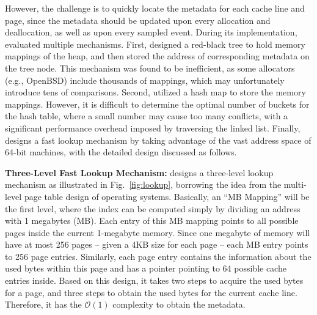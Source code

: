 However, the challenge is to quickly locate the metadata for each cache line and page, since the metadata should be updated upon every allocation and deallocation, as well as upon every sampled event. During its implementation, \MP{} evaluated multiple mechanisms. First, \MP{} designed a red-black tree to hold memory mappings of the heap, and then stored the address of corresponding metadata on the tree node. This mechanism was found to be inefficient, as some allocators (e.g., OpenBSD) include thousands of mappings, which may unfortunately introduce tens of comparisons. Second, \MP{} utilized a hash map to store the memory mappings. However, it is difficult to determine the optimal number of buckets for the hash table, where a small number may cause too many conflicts, with a significant performance overhead imposed by traversing the linked list. Finally, \MP{} designs a fast lookup mechanism by taking advantage of the vast address space of 64-bit machines, with the detailed design discussed as follows. 


\textbf{Three-Level Fast Lookup Mechanism:} \MP{} designs a three-level lookup mechanism as illustrated in Fig.~\ref{fig:lookup}, borrowing the idea from the multi-level page table design of operating systems. Basically, an ``MB Mapping'' will be the first level, where the index can be computed simply by dividing an address with 1 megabytes (MB). Each entry of this MB mapping points to all possible pages inside the current 1-megabyte memory. Since one megabyte of memory will have at most 256 pages -- given a 4KB size for each page -- each MB entry points to 256 page entries. Similarly, each page entry contains the information about the used bytes within this page and has a pointer pointing to 64 possible cache entries inside. Based on this design, it takes two steps to acquire the used bytes for a page, and three steps to obtain the used bytes for the current cache line. Therefore, it has the $\mathcal{O}(1)$ 
complexity to obtain the metadata.  
          
